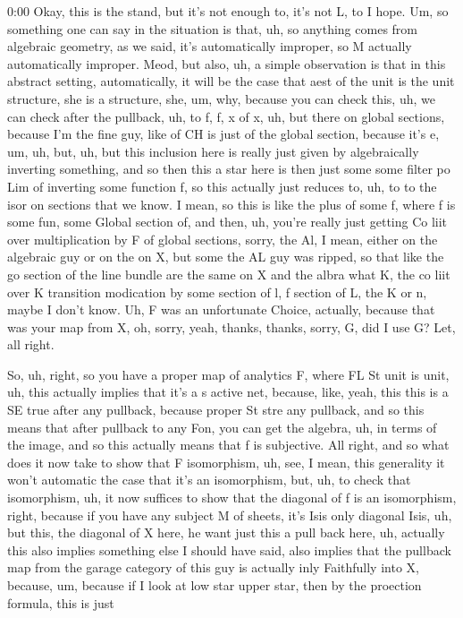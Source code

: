 \begin{unfinished}{0:00}
Okay, this is the stand, but it's not enough to, it's not L, to I hope. Um, so something one can say in the situation is that, uh, so anything comes from algebraic geometry, as we said, it's automatically improper, so M actually automatically improper. Meod, but also, uh, a simple observation is that in this abstract setting, automatically, it will be the case that aest of the unit is the unit structure, she is a structure, she, um, why, because you can check this, uh, we can check after the pullback, uh, to f, f, x of x, uh, but there on global sections, because I'm the fine guy, like of CH is just of the global section, because it's e, um, uh, but, uh, but this inclusion here is really just given by algebraically inverting something, and so then this a star here is then just some some filter po Lim of inverting some function f, so this actually just reduces to, uh, to to the isor on sections that we know. I mean, so this is like the plus of some f, where f is some fun, some Global section of, and then, uh, you're really just getting Co liit over multiplication by F of global sections, sorry, the Al, I mean, either on the algebraic guy or on the on X, but some the AL guy was ripped, so that like the go section of the line bundle are the same on X and the albra what K, the co liit over K transition modication by some section of l, f section of L, the K or n, maybe I don't know. Uh, F was an unfortunate Choice, actually, because that was your map from X, oh, sorry, yeah, thanks, thanks, sorry, G, did I use G? Let, all right.

So, uh, right, so you have a proper map of analytics F, where FL St unit is unit, uh, this actually implies that it's a s active net, because, like, yeah, this this is a SE true after any pullback, because proper St stre any pullback, and so this means that after pullback to any Fon, you can get the algebra, uh, in terms of the image, and so this actually means that f is subjective. All right, and so what does it now take to show that F isomorphism, uh, see, I mean, this generality it won't automatic the case that it's an isomorphism, but, uh, to check that isomorphism, uh, it now suffices to show that the diagonal of f is an isomorphism, right, because if you have any subject M of sheets, it's Isis only diagonal Isis, uh, but this, the diagonal of X here, he want just this a pull back here, uh, actually this also implies something else I should have said, also implies that the pullback map from the garage category of this guy is actually inly Faithfully into X, because, um, because if I look at low star upper star, then by the proection formula, this is just


\end{unfinished}
